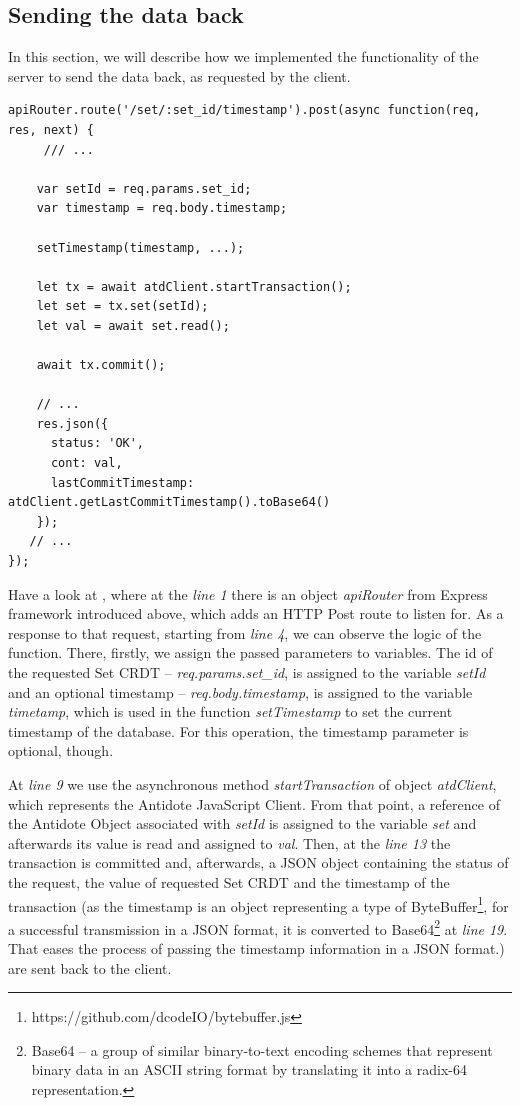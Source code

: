 \subsection*{Sending the data back}

In this section, we will describe how we implemented the functionality of the server to send the data back, as requested by the client.

\begin{lstlisting}[caption={Code for sending back to the client the requested data.}, label={lst:dev1}]
apiRouter.route('/set/:set_id/timestamp').post(async function(req, res, next) {   
     /// ...
    
    var setId = req.params.set_id;
    var timestamp = req.body.timestamp;

    setTimestamp(timestamp, ...);

    let tx = await atdClient.startTransaction();
    let set = tx.set(setId);
    let val = await set.read();

    await tx.commit();

    // ...
    res.json({
      status: 'OK',
      cont: val,
      lastCommitTimestamp: atdClient.getLastCommitTimestamp().toBase64()
    });
   // ... 
});
\end{lstlisting} 

Have a look at , where at the \textit{line 1} there is an object \textit{apiRouter} from Express framework introduced above, which adds an HTTP Post route to listen for. As a response to that request, starting from \textit{line 4}, we can observe the logic of the function. There, firstly, we assign the passed parameters to variables. The id of the requested Set CRDT -- \textit{req.params.set\_id}, is assigned to the variable \textit{setId} and an optional timestamp -- \textit{req.body.timestamp}, is assigned to the variable \textit{timetamp}, which is used in the function \textit{setTimestamp} to set the current timestamp of the database. For this operation, the timestamp parameter is optional, though.

At \textit{line 9} we use the asynchronous method \textit{startTransaction} of object \textit{atdClient}, which represents the Antidote JavaScript Client. From that point, a reference of the Antidote Object associated with \textit{setId} is assigned to the variable \textit{set} and afterwards its value is read and assigned to \textit{val}. Then, at the \textit{line 13} the transaction is committed and, afterwards, a JSON object containing the status of the request, the value of requested Set CRDT and the timestamp of the transaction (as the timestamp is an object representing a type of ByteBuffer\footnote{https://github.com/dcodeIO/bytebuffer.js}, for a successful transmission in a JSON format, it is converted to Base64\footnote{Base64 -- a group of similar binary-to-text encoding schemes that represent binary data in an ASCII string format by translating it into a radix-64 representation\cite{53}.} at \textit{line 19}. That eases the process of passing the timestamp information in a JSON format.) are sent back to the client.

